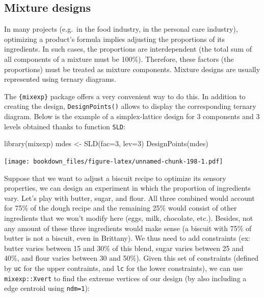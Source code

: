 \documentclass[
]{krantz}
\makeatletter
\newenvironment{Shaded}{\begin{snugshade}}{\end{snugshade}}
\newcommand{\AttributeTok}[1]{\textcolor[rgb]{0.61,0.61,0.61}{#1}}
\newcommand{\DecValTok}[1]{\textcolor[rgb]{0.06,0.06,0.06}{#1}}
\newcommand{\FunctionTok}[1]{\textcolor[rgb]{0,0,0}{#1}}
\newcommand{\NormalTok}[1]{#1}
\newcommand{\OtherTok}[1]{\textcolor[rgb]{0.37,0.37,0.37}{#1}}
\newenvironment{kframe}{%
\medskip{}
\setlength{\fboxsep}{.8em}
 \def\at@end@of@kframe{}%
 \ifinner\ifhmode%
  \def\at@end@of@kframe{\end{minipage}}%
  \begin{minipage}{\columnwidth}%
 \fi\fi%
 \def\FrameCommand##1{\hskip\@totalleftmargin \hskip-\fboxsep
 \colorbox{shadecolor}{##1}\hskip-\fboxsep
     \hskip-\linewidth \hskip-\@totalleftmargin \hskip\columnwidth}%
 \MakeFramed {\advance\hsize-\width
   \@totalleftmargin\z@ \linewidth\hsize
   \@setminipage}}%
 {\par\unskip\endMakeFramed%
 \at@end@of@kframe}
\renewenvironment{Shaded}{\begin{kframe}}{\end{kframe}}
\makeatother
\begin{document}
\hypertarget{mixture-designs}{%
\subsection{Mixture designs}\label{mixture-designs}}

In many projects (e.g.~in the food industry, in the personal care industry), optimizing a product's formula implies adjusting the proportions of its ingredients. In such cases, the proportions are interdependent (the total sum of all components of a mixture must be 100\%). Therefore, these factors (the proportions) must be treated as mixture components. Mixture designs are usually represented using ternary diagrams.

The \texttt{\{mixexp\}} package offers a very convenient way to do this. In addition to creating the design, \texttt{DesignPoints()} allows to display the corresponding ternary diagram. Below is the example of a simplex-lattice design for 3 components and 3 levels obtained thanks to function \texttt{SLD}:

\begin{Shaded}
\begin{Highlighting}[]
\FunctionTok{library}\NormalTok{(mixexp)}
\NormalTok{mdes }\OtherTok{\textless{}{-}} \FunctionTok{SLD}\NormalTok{(}\AttributeTok{fac=}\DecValTok{3}\NormalTok{, }\AttributeTok{lev=}\DecValTok{3}\NormalTok{)}
\FunctionTok{DesignPoints}\NormalTok{(mdes)}
\end{Highlighting}
\end{Shaded}

\texttt{[image: bookdown\_files/figure-latex/unnamed-chunk-198-1.pdf]}

Suppose that we want to adjust a biscuit recipe to optimize its sensory properties, we can design an experiment in which the proportion of ingredients vary. Let's play with butter, sugar, and flour. All three combined would account for 75\% of the dough recipe and the remaining 25\% would consist of other ingredients that we won't modify here (eggs, milk, chocolate, etc.). Besides, not any amount of these three ingredients would make sense (a biscuit with 75\% of butter is not a biscuit, even in Brittany). We thus need to add constraints (ex: butter varies between 15 and 30\% of this blend, sugar varies between 25 and 40\%, and flour varies between 30 and 50\%). Given this set of constraints (defined by \texttt{uc} for the upper contraints, and \texttt{lc} for the lower constraints), we can use \texttt{mixexp::Xvert} to find the extreme vertices of our design (by also including a edge centroid using \texttt{ndm=1}):
\end{document}
